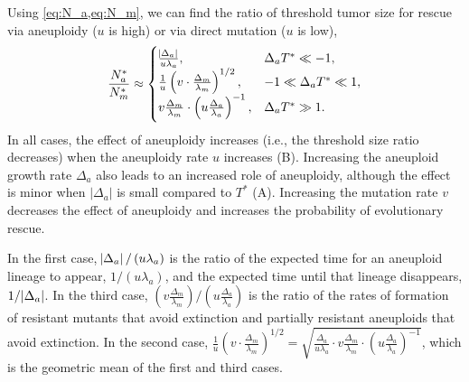 \documentclass[12pt]{extarticle}
\begin{document}
Using \cref{eq:N_a,eq:N_m}, we can find the ratio of threshold tumor size for rescue via aneuploidy ($u$ is high) or via direct mutation ($u$ is low),
\begin{equation} \label{eq:N_ratio}
\frac{N^*_a}{N^*_m} \approx \begin{cases}
    \frac{\abs{\Delta_a}}{u\lambda_a} ,&
  \Delta_a T^* \ll -1 ,\\ 
  \frac{1}{u}\left(v \cdot \frac{\Delta_m}{\lambda_m}\right)^{1/2} ,&
  -1 \ll \Delta_a T^* \ll 1  ,\\ 
  v \frac{\Delta_m}{\lambda_m} \cdot \left(u\frac{\Delta_a}{\lambda_a}\right)^{-1}  ,&
   \Delta_a T^* \gg 1 .
  \end{cases}
\end{equation}
In all cases, the effect of aneuploidy increases (i.e., the threshold size ratio decreases) when the aneuploidy rate $u$ increases (B). Increasing the aneuploid growth rate $\Delta_a$ also leads to an increased role of aneuploidy, although the effect is minor when $|\Delta_a|$ is small compared to $T^*$ (A). Increasing the mutation rate $v$ decreases the effect of aneuploidy and increases the probability of evolutionary rescue.

In the first case, $\abs{\Delta_a}/\left(u\lambda_a\right)$ is  the ratio of the expected time for an aneuploid lineage to appear, $1/\left(u\lambda_a\right)$, and the expected time until that lineage disappears, $1/\abs{\Delta_a}$.
In the third case, $\left(v \frac{\Delta_m}{\lambda_m}\right) / \left(u \frac{\Delta_a}{\lambda_a}\right)$ is the ratio of the rates of formation of resistant mutants that avoid extinction and partially resistant aneuploids that avoid extinction.
In the second case, $\frac{1}{u}\left(v \cdot \frac{\Delta_m}{\lambda_m}\right)^{1/2}=\sqrt{\frac{\Delta_a}{u\lambda_a} \cdot v \frac{\Delta_m}{\lambda_m} \cdot \left(u\frac{\Delta_a}{\lambda_a}\right)^{-1}}$, which is the geometric mean of the first and third cases.
\end{document}
